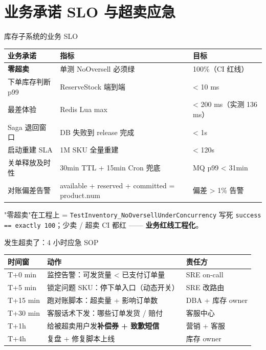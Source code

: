 \documentclass[aspectratio=169,11pt]{beamer}
\begin{document}
\section{业务承诺 SLO 与超卖应急}

\begin{frame}[shrink]{库存子系统的业务 SLO}
\begin{tabular}{@{}lll@{}}
\toprule
业务承诺 & 指标 & 目标 \\
\midrule
\textbf{零超卖} & 单测 NoOversell 必须绿 & 100\%（CI 红线） \\
下单库存判断 p99 & ReserveStock 端到端 & < 10 ms \\
最差体验 & Redis Lua max & < 200 ms（实测 136 ms） \\
Saga 退回窗口 & DB 失败到 release 完成 & < 1s \\
启动重建 SLA & 1M SKU 全量重建 & < 120s \\
关单释放及时性 & 30min TTL + 15min Cron 兜底 & MQ p99 < 31min \\
对账偏差告警 & available + reserved + committed = product.num & 偏差 > 1\% 告警 \\
\bottomrule
\end{tabular}
\vspace{2mm}
\small "零超卖"在工程上 = \texttt{TestInventory\_NoOversellUnderConcurrency} 写死 \texttt{success == exactly 100}；少卖 / 超卖 CI 都红 —— \textbf{业务红线工程化}。
\end{frame}

\begin{frame}[shrink]{发生超卖了：4 小时应急 SOP}
\footnotesize
\begin{tabular}{@{}lp{6.4cm}p{3.6cm}@{}}
\toprule
时间窗 & 动作 & 责任方 \\
\midrule
T+0 min   & 监控告警：可发货量 < 已支付订单量 & SRE on-call \\
T+5 min   & 锁定问题 SKU：停下单入口（动态开关） & SRE 改路由 \\
T+15 min  & 跑对账脚本：超卖量 + 影响订单数 & DBA + 库存 owner \\
T+30 min  & 客服话术下发：哪些订单发货 / 赔付 & 客服中心 \\
T+1h      & 给被超卖用户发\textbf{补偿券 + 致歉短信}  & 营销 + 客服 \\
T+4h      & 复盘 + 修复脚本上线 & 库存 owner \\
\bottomrule
\end{tabular}
\smallskip
{}
\end{frame}
\end{document}
